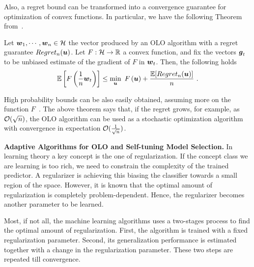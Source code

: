Also, a regret bound can be transformed into a convergence guarantee for optimization of convex functions.
In particular, we have the following Theorem from~\citet{Cesa-BianchiCG04}.
%
\begin{theorem}
\label{theo:online_to_batch}
Let $\boldsymbol{w}_1, \cdots, \boldsymbol{w}_n \in \mathcal{H}$ the vector produced by an OLO algorithm with a regret guarantee $Regret_n(\boldsymbol{u})$.
Let $F:\mathcal{H}\rightarrow\mathbb{R}$ a convex function, and fix the vectors $\boldsymbol{g}_t$ to be unbiased estimate of the gradient of $F$ in $\boldsymbol{w}_t$. Then, the following holds
\[
\mathbb{E}\left[F\left(\frac{1}{n} \boldsymbol{w}_t\right)\right] \leq \min_{\boldsymbol{u}} \ F\left(\boldsymbol{u}\right) + \frac{\mathbb{E}[Regret_n(\boldsymbol{u})]}{n}~.
\]
\end{theorem}

High probability bounds can be also easily obtained, assuming more on the function $F$~\citep{Cesa-BianchiCG04}.
The above theorem says that, if the regret grows, for example, as $\mathcal{O}(\sqrt{n})$, the OLO algorithm can be used as a stochastic optimization algorithm with convergence in expectation $\mathcal{O}(\frac{1}{\sqrt{n}})$.


\vspace{0.2cm}\noindent\textbf{Adaptive Algorithms for OLO and Self-tuning Model Selection.}
In learning theory a key concept is the one of regularization. If the concept class we are learning is too rich, we need to constrain the complexity of the trained predictor. A regularizer is achieving this biasing the classifier towards a small region of the space. However, it is known that the optimal amount of regularization is completely problem-dependent. Hence, the regularizer becomes another parameter to be learned.

Most, if not all, the machine learning algorithms uses a two-stages process to find the optimal amount of regularization. First, the algorithm is trained with a fixed regularization parameter. Second, its generalization performance is estimated together with a change in the regularization parameter. These two steps are repeated till convergence.

